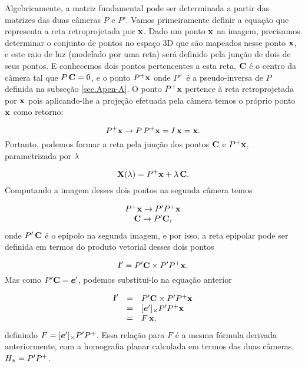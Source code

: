 Algebricamente, a matriz fundamental pode ser determinada a partir das matrizes das duas câmeras $P$ e $P'$. Vamos primeiramente definir a equação que representa a reta retroprojetada por $\mathbf{x}$. Dado um ponto $\mathbf{x}$ na imagem, precisamos determinar o conjunto de pontos no espaço 3D que são mapeados nesse ponto $\mathbf{x}$, e este raio de luz (modelado por uma reta) será definido pela junção de dois de seus pontos. E conhecemos dois pontos pertencentes a esta reta, ${\bf C}$ é o centro da câmera tal que $P\,{\bf C}=0$, e o ponto $P^+\mathbf{x}$ onde $P^+$ é a pseudo-inversa de $P$ definida na subseção \ref{sec.Apen-A}. O ponto $P^+\mathbf{x}$ pertence à reta retroprojetada por $\mathbf{x}$ pois aplicando-lhe a projeção efetuada pela câmera temos o próprio ponto $\mathbf{x}$ como retorno:

\begin{equation*}
P^+\mathbf{x} \rightarrow P\,P^+\mathbf{x}=I\,\mathbf{x}=\mathbf{x}.
\end{equation*}
Portanto, podemos formar a reta pela junção dos pontos ${\bf C}$ e $P^+\mathbf{x}$, parametrizada por $\lambda$

\begin{equation*}
\mathbf{X}(\lambda)=P^+\mathbf{x}+\lambda\,{\bf C}.
\end{equation*}
Computando a imagem desses dois pontos na segunda câmera temos

\begin{equation*}
\begin{array}{c}
P^+\mathbf{x} \rightarrow P'P^+\mathbf{x}\\
{\bf C} \rightarrow P'{\bf C},
\end{array}
\end{equation*}
onde $P'\,{\bf C}$ é o epipolo na segunda imagem, e por isso, a reta epipolar pode ser definida em termos do produto vetorial desses dois pontos

\begin{equation}\label{eq.reta-epipolar-funcao-cameras}
\boldsymbol{l}'=P'{\bf C} \times P'P^+\mathbf{x}.
\end{equation}
Mas como $P'{\bf C}=\boldsymbol{e}'$, podemos substitui-lo na equação anterior

\begin{equation*}
\begin{array}{rcl}
\boldsymbol{l}'&=&P'{\bf C} \times P'P^+\mathbf{x}\\
&=&[\boldsymbol{e}']_\times P'P^+\mathbf{x}\\
&=&F\,\mathbf{x},
\end{array}
\end{equation*}
definindo $F=[\boldsymbol{e}']_\times P'P^+$. Essa relação para $F$ é a mesma fórmula derivada anteriormente, com a homografia planar calculada em termos das duas câmeras, $H_{\pi}=P'P^+$.


